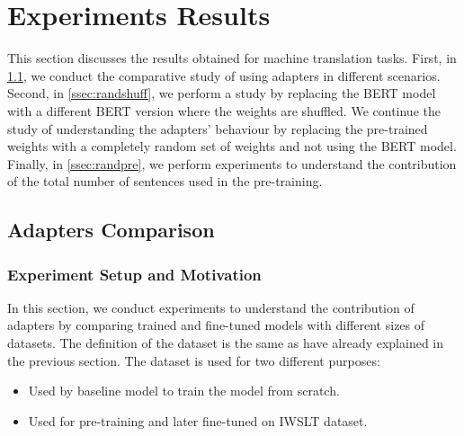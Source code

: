 \section{Experiments Results}
This section discusses the results obtained for machine translation tasks. First, in \cref{ssec:adaptcomp}, we conduct the comparative study of using adapters in different scenarios. Second, in \cref{ssec:randshuff}, we perform a study by replacing the BERT model with a different BERT version where the weights are shuffled. We continue the study of understanding the adapters' behaviour by replacing the pre-trained weights with a completely random set of weights and not using the BERT model. Finally, in \cref{ssec:randpre}, we perform experiments to understand the contribution of the total number of sentences used in the pre-training.

\subsection{Adapters Comparison}
\label{ssec:adaptcomp}
\subsubsection{Experiment Setup and Motivation}
In this section, we conduct experiments to understand the contribution of adapters by comparing trained and fine-tuned models with different sizes of datasets. The definition of the dataset is the same as have already explained in the previous section. The dataset is used for two different purposes:
\begin{itemize}
    \item Used by baseline model to train the model from scratch.
    \item Used for pre-training and later fine-tuned on IWSLT dataset.
\end{itemize}

